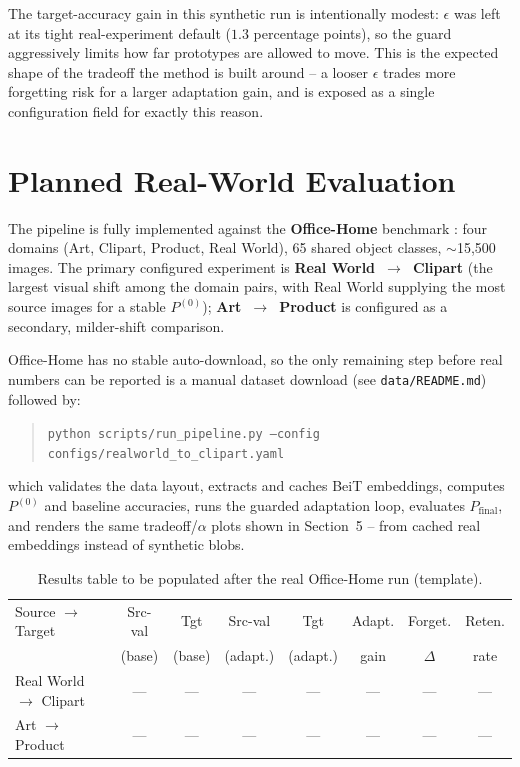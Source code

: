 \documentclass[11pt]{article}
\begin{document}
The target-accuracy gain in this synthetic run is intentionally modest: $\epsilon$ was left at
its tight real-experiment default ($1.3$ percentage points), so the guard aggressively limits
how far prototypes are allowed to move. This is the expected shape of the tradeoff the method is
built around -- a looser $\epsilon$ trades more forgetting risk for a larger adaptation gain, and
is exposed as a single configuration field for exactly this reason.

\section{Planned Real-World Evaluation}

The pipeline is fully implemented against the \textbf{Office-Home} benchmark
\cite{venkateswara2017officehome}: four domains (Art, Clipart, Product, Real World), 65 shared
object classes, $\sim$15{,}500 images. The primary configured experiment is
\textbf{Real World~$\to$~Clipart} (the largest visual shift among the domain pairs, with Real
World supplying the most source images for a stable $P^{(0)}$); \textbf{Art~$\to$~Product} is
configured as a secondary, milder-shift comparison.

Office-Home has no stable auto-download, so the only remaining step before real numbers can be
reported is a manual dataset download (see \texttt{data/README.md}) followed by:
\begin{quote}
\texttt{python scripts/run\_pipeline.py --config configs/realworld\_to\_clipart.yaml}
\end{quote}
which validates the data layout, extracts and caches BeiT embeddings, computes $P^{(0)}$ and
baseline accuracies, runs the guarded adaptation loop, evaluates $P_{\mathrm{final}}$, and
renders the same tradeoff/$\alpha$ plots shown in Section~5 -- from cached real embeddings
instead of synthetic blobs.

\begin{table}[h]
\centering
\caption{Results table to be populated after the real Office-Home run (template).}
\footnotesize
\setlength{\tabcolsep}{4.5pt}
\begin{tabular}{@{}lccccccc@{}}
\toprule
Source $\to$ Target & Src-val & Tgt & Src-val & Tgt &
Adapt. & Forget. & Reten. \\
 & (base) & (base) & (adapt.) & (adapt.) & gain & $\Delta$ & rate \\
\midrule
Real World $\to$ Clipart & --- & --- & --- & --- & --- & --- & --- \\
Art $\to$ Product & --- & --- & --- & --- & --- & --- & --- \\
\bottomrule
\end{tabular}
\end{table}
\end{document}

